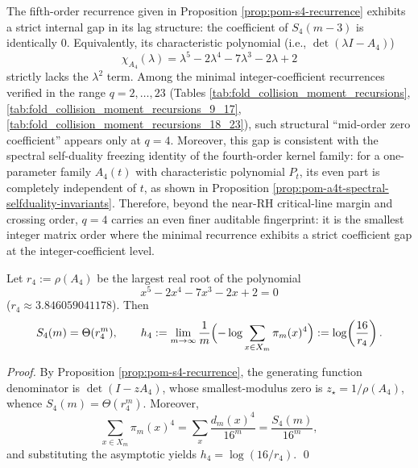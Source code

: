 \begin{remark}\label{rem:pom-s4-zero-coefficient-lock}
The fifth-order recurrence given in Proposition \ref{prop:pom-s4-recurrence} exhibits a strict internal gap in its lag structure: the coefficient of \(S_4(m-3)\) is identically \(0\).
Equivalently, its characteristic polynomial (i.e., \(\det(\lambda I-A_4)\))
\[
\chi_{A_4}(\lambda)=\lambda^5-2\lambda^4-7\lambda^3-2\lambda+2
\]
strictly lacks the \(\lambda^2\) term.
Among the minimal integer-coefficient recurrences verified in the range \(q=2,\dots,23\) (Tables \ref{tab:fold_collision_moment_recursions}, \ref{tab:fold_collision_moment_recursions_9_17}, \ref{tab:fold_collision_moment_recursions_18_23}), such structural ``mid-order zero coefficient'' appears only at \(q=4\).
Moreover, this gap is consistent with the spectral self-duality freezing identity of the fourth-order kernel family: for a one-parameter family \(A_4(t)\) with characteristic polynomial \(P_t\), its even part is completely independent of \(t\), as shown in Proposition \ref{prop:pom-a4t-spectral-selfduality-invariants}.
Therefore, beyond the near-RH critical-line margin and crossing order, \(q=4\) carries an even finer auditable fingerprint: it is the smallest integer matrix order where the minimal recurrence exhibits a strict coefficient gap at the integer-coefficient level.
\end{remark}

\begin{corollary}\label{cor:pom-s4-asymptotic}
Let \(r_4:=\rho(A_4)\) be the largest real root of the polynomial
$$
x^5-2x^4-7x^3-2x+2=0
$$
(\(r_4\approx 3.846059041178\)). Then
$$
S_4(m)=\Theta(r_4^m),
\qquad
h_4:=\lim_{m\to\infty}\frac{1}{m}\Bigl(-\log\sum_{x\in X_m}\pi_m(x)^4\Bigr)
:=\log\!\left(\frac{16}{r_4}\right).
$$
\end{corollary}
\begin{proof}
By Proposition \ref{prop:pom-s4-recurrence}, the generating function denominator is \(\det(I-zA_4)\), whose smallest-modulus zero is \(z_\star=1/\rho(A_4)\), whence \(S_4(m)=\Theta(r_4^m)\). Moreover,
$$
\sum_{x\in X_m}\pi_m(x)^4=\sum_x\frac{d_m(x)^4}{16^m}=\frac{S_4(m)}{16^m},
$$
and substituting the asymptotic yields \(h_4=\log(16/r_4)\). \qed
\end{proof}


